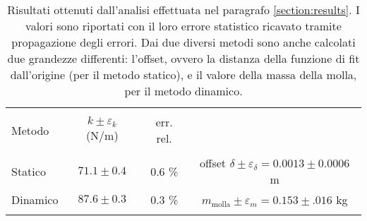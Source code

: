 \begin{table}[h!]
    \centering
    \footnotesize
    \caption{Risultati ottenuti dall'analisi effettuata nel paragrafo \ref{section:results}. I valori sono 
    riportati con il loro errore statistico ricavato tramite propagazione degli errori. Dai due diversi metodi sono
    anche calcolati due grandezze differenti: l'offset, ovvero la distanza della funzione di fit dall'origine (per il metodo 
    statico), e il valore della massa della molla, per il metodo dinamico.}
    \label{table:results}
    \begin{tabular}{lccc}
        \hline\hline\\[-1.5ex]
        Metodo   & $k\pm\varepsilon_k$ (N/m) & err. rel. &                                                            \\[+0.5ex] \hline \\[-1.5ex]
        Statico  & $71.1\pm0.4$              & 0.6 \%    & offset $\delta\pm\varepsilon_{\delta} = 0.0013\pm0.0006$ m \\[+0.5ex]
        Dinamico & $87.6\pm0.3$              & 0.3 \%    & $m_{\text{molla}}\pm\varepsilon_m = 0.153\pm.016$ kg       \\[+0.5ex]
        \hline \\[-1.5ex]

    \end{tabular}
\end{table}